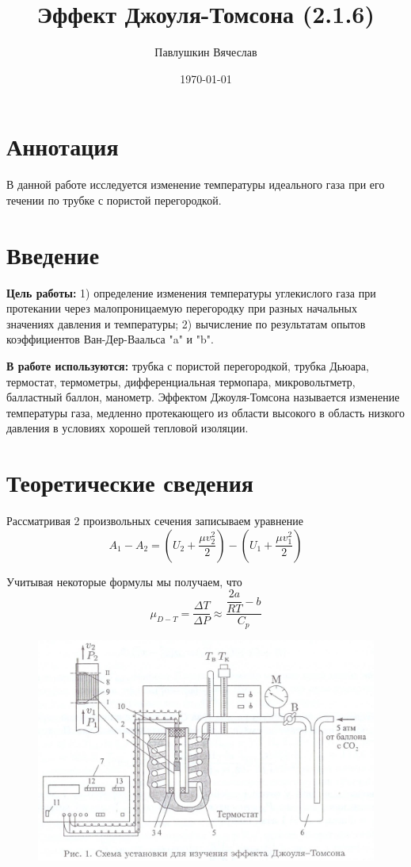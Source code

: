 \documentclass[a4paper,12pt]{article}
\title{Эффект Джоуля-Томсона (2.1.6)}
\author{Павлушкин Вячеслав}
\date{\today}
\theoremstyle{definition}
\begin{document}
	\maketitle
	
	\section{Аннотация}
	В данной работе исследуется изменение температуры идеального газа при его течении по трубке с пористой перегородкой. 
	
	\section{Введение}
	\noindent\textbf{Цель работы:} 1) определение изменения температуры углекислого газа при протекании через малопроницаемую перегородку при разных начальных значениях давления и температуры; 2) вычисление по результатам опытов коэффициентов Ван-Дер-Ваальса "a" и "b".
	
	
	\bigskip
	\noindent\textbf{В работе используются:} трубка с пористой перегородкой, трубка Дьюара, термостат, термометры, дифференциальная термопара, микровольтметр, балластный баллон, манометр.
	Эффектом Джоуля-Томсона называется изменение температуры газа, медленно протекающего из области высокого в область низкого давления в условиях хорошей тепловой изоляции.
	
	\section{Теоретические сведения}
	
	Рассматривая 2 произвольных сечения записываем уравнение 
	\[A_1 - A_2 = \left( U_2 + \dfrac{\mu v_2^2}{2} \right) - \left( U_1 + \dfrac{\mu v_1^2}{2} \right) \]
	
	Учитывая некоторые формулы мы получаем, что 
	\begin{equation}
		\mu_{D-T} = \dfrac{\Delta T}{\Delta P} \approx \dfrac{\dfrac{2a}{RT} - b}{C_p}
		\label{3}
	\end{equation}
	\begin{figure}[t]
		\begin{center}
			\includegraphics[scale = 1.2]{facility}
		\end{center}
	\end{figure}
\end{document}
